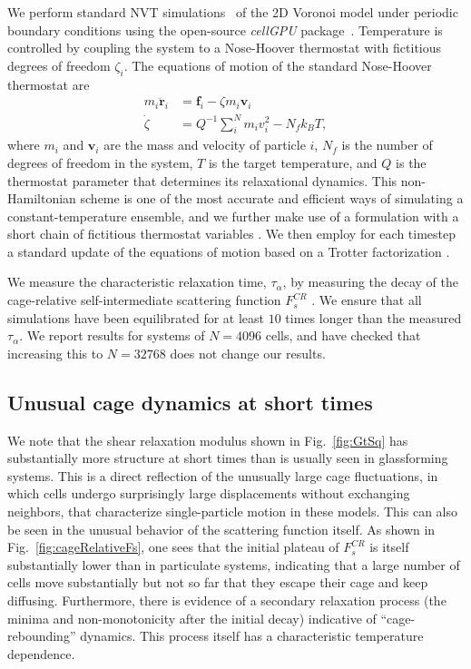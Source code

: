 \documentclass[aps,reprint,superscriptaddress,nofootinbib, notitlepage,prl]{revtex4-2}
\begin{document}
We perform standard NVT simulations~\cite{martyna1996explicit,frenkel2002understanding} of the 2D Voronoi model under periodic boundary conditions using the open-source \emph{cellGPU} package~\cite{sussman2017cellgpu}. Temperature is controlled by coupling the system to a Nose-Hoover thermostat with fictitious degrees of freedom $\zeta_i$. The equations of motion of the standard Nose-Hoover thermostat are
\begin{align}
    m_i \ddot{\bm{r}}_i &= \bm{f}_i - \zeta m_i \bm{v}_i\\
    \dot{\zeta} &= Q^{-1} \sum_i^N m_i v_i^2 - N_f k_BT,
\end{align}
where $m_i$ and $\bm{v}_i$ are the mass and velocity of particle $i$, $N_f$ is the number of degrees of freedom in the system, $T$ is the target temperature, and $Q$ is the thermostat parameter that determines its relaxational dynamics. This non-Hamiltonian scheme is one of the most accurate and efficient ways of simulating a constant-temperature ensemble, and we further make use of a formulation with a short chain of fictitious thermostat variables \cite{martyna1996explicit}. We then employ for each timestep a standard update of the equations of motion based on a Trotter factorization \cite{frenkel2002understanding}.

We measure the characteristic relaxation time, $\tau_\alpha$, by measuring the decay of the cage-relative self-intermediate scattering function $F^{CR}_s$ \cite{vivek2017long, illing2017mermin}.
We ensure that all simulations have been equilibrated for at least $10$ times longer than the measured $\tau_\alpha$.
We report results for systems of $N=4096$ cells, and have checked that increasing this to $N=32768$ does not change our results.

\subsection{Unusual cage dynamics at short times}

We note that the shear relaxation modulus shown in Fig.~\ref{fig:GtSq} has substantially more structure at short times than is usually seen in glassforming systems.
This is a direct reflection of the unusually large cage fluctuations, in which cells undergo surprisingly large displacements without exchanging neighbors, that characterize single-particle motion in these models.
This can also be seen in the unusual behavior of the scattering function itself. 
As shown in Fig.~\ref{fig:cageRelativeFs}, one sees that the initial plateau of $F^{CR}_s$ is itself substantially lower than in particulate systems, indicating that a large number of cells move substantially but not so far that they escape their cage and keep diffusing.
Furthermore, there is evidence of a secondary relaxation process (the minima and non-monotonicity after the initial decay) indicative of ``cage-rebounding'' dynamics. This process itself has a characteristic temperature dependence.
\end{document}
